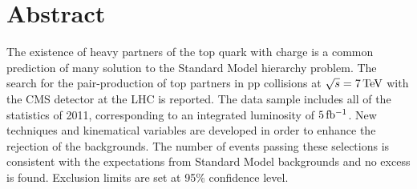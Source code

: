 \begingroup
\let\clearpage\relax
\let\cleardoublepage\relax
\let\cleardoublepage\relax

\chapter*{Abstract}
The existence of heavy partners of the top quark with charge 
is a common prediction of many solution to the Standard Model hierarchy
problem. The search for the pair-production of top partners in $\mathrm{pp}$ collisions at
$\sqrt{s} = \unit[7]{TeV}$ with the CMS detector at the LHC is reported. The
data sample includes all of the statistics of 2011, corresponding to an
integrated luminosity of
$\unit[5]{fb^{-1}}$.
New techniques and kinematical variables are developed in order to enhance
the rejection of the backgrounds.
The number of events passing these selections is consistent with the
expectations from Standard Model backgrounds and no excess is found.
Exclusion limits are set at 95\% confidence level. 





\endgroup			

\vfill
